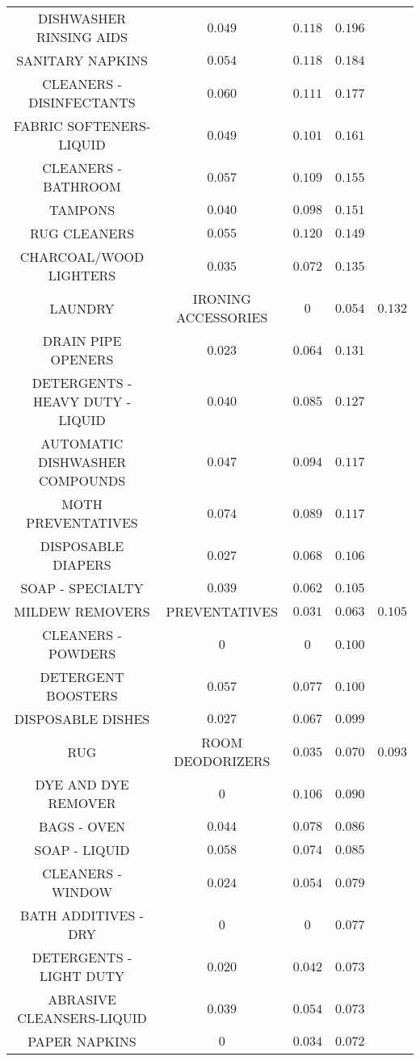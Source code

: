 \begin{table}[!htbp]
\begin{tabular}{@{\extracolsep{5pt}} cccc}
DISHWASHER RINSING AIDS & $0.049$ & $0.118$ & $0.196$ \\ 
SANITARY NAPKINS & $0.054$ & $0.118$ & $0.184$ \\ 
CLEANERS - DISINFECTANTS & $0.060$ & $0.111$ & $0.177$ \\ 
FABRIC SOFTENERS-LIQUID & $0.049$ & $0.101$ & $0.161$ \\ 
CLEANERS - BATHROOM & $0.057$ & $0.109$ & $0.155$ \\ 
TAMPONS & $0.040$ & $0.098$ & $0.151$ \\ 
RUG CLEANERS & $0.055$ & $0.120$ & $0.149$ \\ 
CHARCOAL/WOOD LIGHTERS & $0.035$ & $0.072$ & $0.135$ \\ 
LAUNDRY & IRONING ACCESSORIES & $0$ & $0.054$ & $0.132$ \\ 
DRAIN PIPE OPENERS & $0.023$ & $0.064$ & $0.131$ \\ 
DETERGENTS - HEAVY DUTY - LIQUID & $0.040$ & $0.085$ & $0.127$ \\ 
AUTOMATIC DISHWASHER COMPOUNDS & $0.047$ & $0.094$ & $0.117$ \\ 
MOTH PREVENTATIVES & $0.074$ & $0.089$ & $0.117$ \\ 
DISPOSABLE DIAPERS & $0.027$ & $0.068$ & $0.106$ \\ 
SOAP - SPECIALTY & $0.039$ & $0.062$ & $0.105$ \\ 
MILDEW REMOVERS & PREVENTATIVES & $0.031$ & $0.063$ & $0.105$ \\ 
CLEANERS - POWDERS & $0$ & $0$ & $0.100$ \\ 
DETERGENT BOOSTERS & $0.057$ & $0.077$ & $0.100$ \\ 
DISPOSABLE DISHES & $0.027$ & $0.067$ & $0.099$ \\ 
RUG & ROOM DEODORIZERS & $0.035$ & $0.070$ & $0.093$ \\ 
DYE AND DYE REMOVER & $0$ & $0.106$ & $0.090$ \\ 
BAGS - OVEN & $0.044$ & $0.078$ & $0.086$ \\ 
SOAP - LIQUID & $0.058$ & $0.074$ & $0.085$ \\ 
CLEANERS - WINDOW & $0.024$ & $0.054$ & $0.079$ \\ 
BATH ADDITIVES - DRY & $0$ & $0$ & $0.077$ \\ 
DETERGENTS - LIGHT DUTY & $0.020$ & $0.042$ & $0.073$ \\ 
ABRASIVE CLEANSERS-LIQUID & $0.039$ & $0.054$ & $0.073$ \\ 
PAPER NAPKINS & $0$ & $0.034$ & $0.072$ \\ 

\end{tabular}
\end{table}

